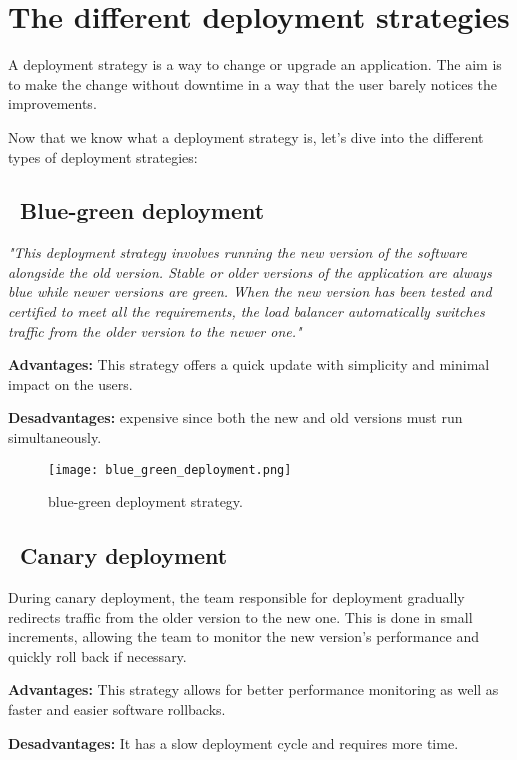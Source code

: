 \section{The different deployment strategies}
A deployment strategy is a way to change or upgrade an application. The aim is to make the change without downtime in a way that the user barely notices the improvements.
\par Now that we know what a deployment strategy is, let's dive into the different types of deployment strategies:

\subsection*{ \textbullet\ Blue-green deployment}
\emph{"This deployment strategy involves running the new version of the software alongside the old version.
Stable or older versions of the application are always blue while newer versions are green.
When the new version has been tested and certified to meet all the requirements, the load balancer automatically switches traffic from the older version to the newer one."}\cite{deploymentStrategies}
\par \noindent \textbf{Advantages:} This strategy offers a quick update with simplicity and minimal impact on the users.
\par \noindent \textbf{Desadvantages:} expensive since both the new and old versions must run simultaneously.

\begin{figure}[H]
    \centering
    \texttt{[image: blue\_green\_deployment.png]}
    \caption{blue-green deployment strategy.}
    \label{fig:blue-green-deployment-strategy}
\end{figure}

\subsection*{ \textbullet\ Canary deployment}
During canary deployment, the team responsible for deployment gradually redirects traffic from the older version to the new one.
This is done in small increments, allowing the team to monitor the new version's performance and quickly roll back if necessary.
\par \noindent \textbf{Advantages:} This strategy allows for better performance monitoring as well as faster and easier software rollbacks.
\par \noindent \textbf{Desadvantages:} It has a slow deployment cycle and requires more time.

